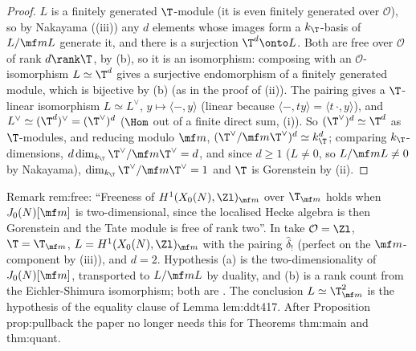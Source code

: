 \begin{proof}
$L$ is a finitely generated $\T$-module (it is even finitely generated over $\mathcal O$), so by Nakayama ((iii)) any $d$ elements whose
images form a $k_\T$-basis of $L/\mf mL$ generate it, and there is a surjection $\T^d\onto L$. Both are free over $\mathcal O$ of rank $d\rank\T$, by (b), so it is an
isomorphism: composing with an $\mathcal O$-isomorphism $L\simeq\T^d$ gives a surjective endomorphism of a finitely generated module, which is bijective by
(b) (as in the proof of (ii)). The pairing gives a $\T$-linear isomorphism $L\simeq L^\vee$, $y\mapsto\langle-,y\rangle$ (linear because
$\langle-,ty\rangle=\langle t\,\cdot,y\rangle$), and $L^\vee\simeq(\T^d)^\vee=(\T^\vee)^d$ ($\Hom$ out of a finite direct sum, (i)). So $(\T^\vee)^d\simeq\T^d$
as $\T$-modules, and reducing modulo $\mf m$, $(\T^\vee/\mf m\T^\vee)^d\simeq k_\T^d$; comparing $k_\T$-dimensions, $d\dim_{k_\T}\T^\vee/\mf m\T^\vee=d$, and since $d\ge1$
($L\ne0$, so $L/\mf mL\ne0$ by Nakayama), $\dim_{k_\T}\T^\vee/\mf m\T^\vee=1$ and $\T$ is Gorenstein by (ii).
\end{proof}

\begin{paperlink}\label{pl:modules:free}
Remark rem:free: ``Freeness of $H^1(X_0(N),\Zl)_{\mf m}$ over $\T_{\mf m}$ holds when $J_0(N)[\mf m]$ is two-dimensional, since the localised Hecke algebra is then Gorenstein and the
Tate module is free of rank two''. In  take $\mathcal O=\Zl$, $\T=\T_{\mf m}$, $L=H^1(X_0(N),\Zl)_{\mf m}$ with the pairing $\hat\delta_!$ (perfect on the
$\mf m$-component by (iii)), and $d=2$. Hypothesis (a) is the two-dimensionality of $J_0(N)[\mf m]$, transported to $L/\mf mL$ by duality, and (b) is a
rank count from the Eichler-Shimura isomorphism; both are . The conclusion $L\simeq\T_{\mf m}^2$ is the hypothesis of the equality clause of Lemma
lem:ddt417. After Proposition prop:pullback the paper no longer needs this for Theorems thm:main and thm:quant.
\end{paperlink}

